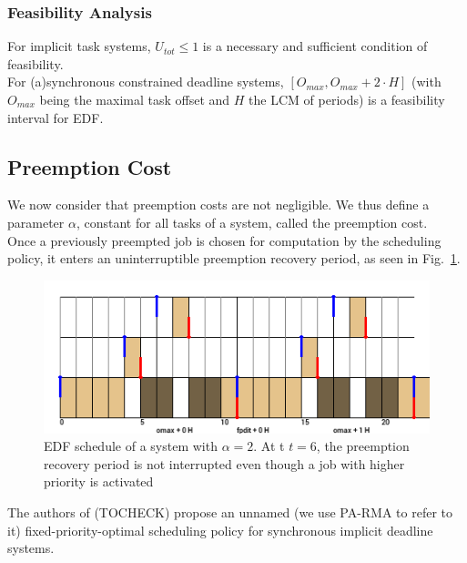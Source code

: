 \documentclass[a4paper,10pt]{article}
\begin{document}
        \subsubsection{Feasibility Analysis}

        For implicit task systems, $U_{tot} \leqslant 1$ is a necessary and sufficient condition of feasibility.\\

        For (a)synchronous constrained deadline systems, $[O_{max}, O_{max} + 2 \cdot H]$ (with $O_{max}$ being the maximal task offset and $H$ the LCM of periods) is a feasibility interval for EDF.

    \subsection{Preemption Cost}

        We now consider that preemption costs are not negligible. We thus define a parameter $\alpha$, constant for all tasks of a system, called the preemption cost.\\

        Once a previously preempted job is chosen for computation by the scheduling policy, it enters an uninterruptible preemption recovery period, as seen in Fig.~\ref{fig:prp}.\\

        \begin{figure}[H]
        \begin{center}
            \includegraphics[width=\textwidth]{figs/atomicpreemption_example.png}
            \caption{EDF schedule of a system with $\alpha=2$. At t $t=6$, the preemption recovery period is not interrupted even though a job with higher priority is activated}
            \label{fig:prp}
        \end{center}
        \end{figure}

        The authors of \cite{meumeu2007extending} (TOCHECK) propose an unnamed (we use PA-RMA to refer to it) fixed-priority-optimal scheduling policy for synchronous implicit deadline systems.
\end{document}
